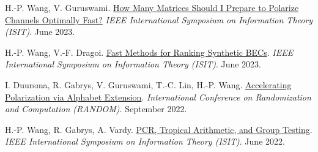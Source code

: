 \documentclass{article}
\begin{document}
\begin{thebibliography}{C99}
    H.-P. Wang, V. Guruswami.
    \href{https://doi.org/10.1109/ISIT54713.2023.10206989}
    {How Many Matrices Should I Prepare to Polarize Channels Optimally Fast?}
    \emph{IEEE International Symposium on Information Theory (ISIT)}.
    June 2023.

    H.-P. Wang, V.-F. Dragoi.
    \href{https://doi.org/10.1109/ISIT54713.2023.10206704}
    {Fast Methods for Ranking Synthetic BECs}.
    \emph{IEEE International Symposium on Information Theory (ISIT)}.
    June 2023.

    I. Duursma, R. Gabrys, V. Guruswami, T.-C. Lin, H.-P. Wang.
    \href{https://doi.org/10.4230/LIPIcs.APPROX/RANDOM.2022.17}
    {Accelerating Polarization via Alphabet Extension}.
    \emph{International Conference on Randomization and Computation (RANDOM)}.
    September 2022.

    H.-P. Wang, R. Gabrys, A. Vardy.
    \href{https://doi.org/10.1109/ISIT50566.2022.9834718}
    {PCR, Tropical Arithmetic, and Group Testing}.
    \emph{IEEE International Symposium on Information Theory (ISIT)}.
    June 2022.
\end{thebibliography}
\egroup
\end{document}
